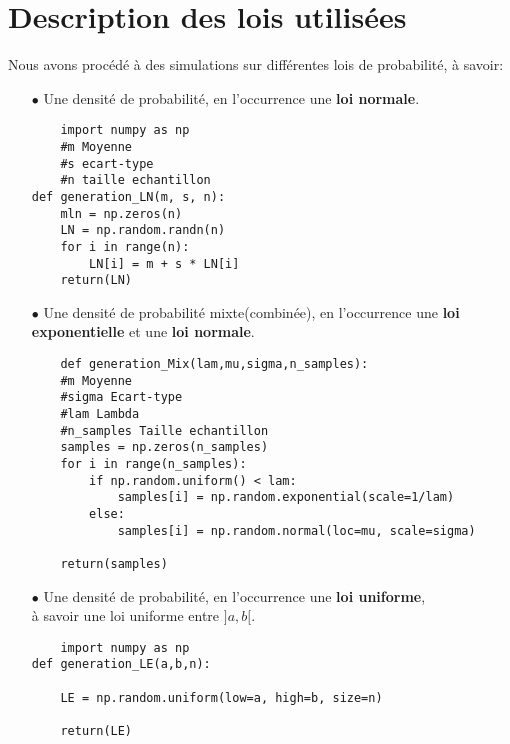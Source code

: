 \section{Description des lois utilisées}
Nous avons procédé à des simulations sur différentes lois de probabilité, à savoir:
\newline 
\newline    
\begin{itemize}
   \item[$\bullet$] Une densité de probabilité, en l'occurrence une \textbf{loi normale}.\\
   \begin{lstlisting}
    import numpy as np
    #m Moyenne
    #s ecart-type
    #n taille echantillon
def generation_LN(m, s, n):
    mln = np.zeros(n)
    LN = np.random.randn(n)
    for i in range(n):
        LN[i] = m + s * LN[i]
    return(LN)

    \end{lstlisting}

    \vspace{1.5cm}
       \item[$\bullet$] Une densité de probabilité mixte(combinée), en l'occurrence une \textbf{loi exponentielle} et une \textbf{loi normale}.\\
   \begin{lstlisting}
    def generation_Mix(lam,mu,sigma,n_samples):
    #m Moyenne
    #sigma Ecart-type
    #lam Lambda
    #n_samples Taille echantillon
    samples = np.zeros(n_samples)
    for i in range(n_samples):
        if np.random.uniform() < lam:
            samples[i] = np.random.exponential(scale=1/lam)
        else:
            samples[i] = np.random.normal(loc=mu, scale=sigma)
            
    return(samples) 
    \end{lstlisting}

           \item[$\bullet$] Une densité de probabilité, en l'occurrence une \textbf{loi uniforme},\\ à savoir une loi uniforme entre $] a ,b [$.\\
           
   \begin{lstlisting}
    import numpy as np
def generation_LE(a,b,n):

    LE = np.random.uniform(low=a, high=b, size=n)

    return(LE)

    \end{lstlisting}
    \vspace{0.5cm}
\end{itemize}

